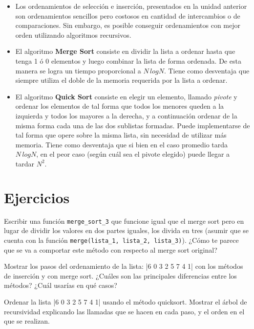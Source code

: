 \begin{itemize}

\item Los ordenamientos de selección e inserción, presentados en la unidad
anterior son ordenamientos sencillos pero costosos en cantidad de
intercambios o de comparaciones.  Sin embargo, es posible conseguir
ordenamientos con mejor orden utilizando algoritmos recursivos.

\item El algoritmo {\bf Merge Sort} consiste en dividir la lista a ordenar
hasta que tenga 1 ó 0 elementos y luego combinar la lista de forma ordenada.
De esta manera se logra un tiempo proporcional a $N \, log N$.  Tiene como
desventaja que siempre utiliza el doble de la memoria requerida por la lista a
ordenar.

\item El algoritmo {\bf Quick Sort} consiste en elegir un elemento, llamado
\emph{pivote} y ordenar los elementos de tal forma que todos los menores queden
a la izquierda y todos los mayores a la derecha, y a continuación ordenar de la
misma forma cada una de las dos sublistas formadas.  Puede implementarse de tal
forma que opere sobre la misma lista, sin necesidad de utilizar más memoria.
Tiene como desventaja que si bien en el caso promedio tarda $N \, log N$, en el
peor caso (según cuál sea el pivote elegido) puede llegar a tardar $N^2$.

\end{itemize}

\newpage
\section{Ejercicios}

\begin{ejercicio}
Escribir una función \verb!merge_sort_3! que funcione igual que el merge sort
pero en lugar de dividir los valores en dos partes iguales, los divida en tres
(asumir que se cuenta con la función \verb!merge(lista_1, lista_2, lista_3)!).
¿Cómo te parece que se va a comportar este método con respecto al merge sort
original?
\end{ejercicio}

\begin{ejercicio}
Mostrar los pasos del ordenamiento de la lista: |6 0 3 2 5 7 4 1| con
los métodos de inserción y con merge sort. ¿Cuáles son las principales
diferencias entre los métodos? ¿Cuál usarías en qué casos?
\end{ejercicio}

\begin{ejercicio}
Ordenar la lista |6 0 3 2 5 7 4 1| usando el método quicksort. Mostrar
el árbol de recursividad explicando las llamadas que se hacen en cada
paso, y el orden en el que se realizan.
\end{ejercicio}
